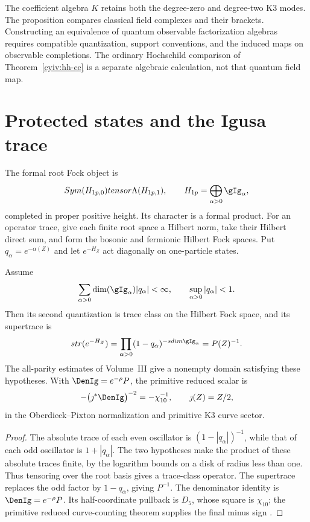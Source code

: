 The coefficient algebra $K$ retains both the degree-zero and degree-two
K3 modes.
The proposition compares classical field complexes and their brackets.
Constructing an equivalence of quantum observable factorization algebras
requires compatible quantization, support conventions, and the induced
maps on observable completions.
The ordinary Hochschild comparison of Theorem~\ref{cyiv:hh-ce} is a
separate algebraic calculation, not that quantum field map.

\section{Protected states and the Igusa trace}
The formal root Fock object is
\[
 \widehat\Sym(\mathcal H_{\mathrm{1p},\bar0})
 \widehat\tensor\widehat\Lambda(\mathcal H_{\mathrm{1p},\bar1}),
 \qquad \mathcal H_{\mathrm{1p}}=\bigoplus_{\alpha>0}\gIg_\alpha,
\]
completed in proper positive height. Its character is a formal product.
For an operator trace, give each finite root space a Hilbert norm, take
their Hilbert direct sum, and form the bosonic and fermionic Hilbert
Fock spaces. Put $q_\alpha=e^{-\alpha(Z)}$ and let $e^{-H_Z}$ act
diagonally on one-particle states.

\begin{theorem}
Assume
\[
 \sum_{\alpha>0}\dim(\gIg_\alpha)|q_\alpha|<\infty,
 \qquad \sup_{\alpha>0}|q_\alpha|<1.
\]
Then its second quantization is trace class on the Hilbert Fock space,
and its supertrace is
\[
 \operatorname{str}(e^{-H_Z})
 =\prod_{\alpha>0}(1-q_\alpha)^{-\sdim\gIg_\alpha}=P(Z)^{-1}.
\]
The all-parity estimates of Volume~III give a nonempty domain satisfying
these hypotheses. With $\DenIg=e^{-\rho}P$, the primitive reduced
scalar is
\[
 -\bigl(\jmath^*\DenIg\bigr)^{-2}=-\chi_{10}^{-1},
 \qquad \jmath(Z)=Z/2,
\]
in the Oberdieck--Pixton normalization and primitive K3 curve sector.
\end{theorem}
\begin{proof}
The absolute trace of each even oscillator is
$(1-|q_\alpha|)^{-1}$, while that of each odd oscillator is
$1+|q_\alpha|$. The two hypotheses make the product of these absolute
traces finite, by the logarithm bounds on a disk of radius less than
one. Thus tensoring over the root basis gives a trace-class operator.
The supertrace replaces the odd factor by $1-q_\alpha$, giving
$P^{-1}$. The denominator identity is $\DenIg=e^{-\rho}P$.
Its half-coordinate pullback is $D_5$, whose square is $\chi_{10}$;
the primitive reduced curve-counting theorem supplies the final minus
sign \cite{OP}.
\end{proof}

